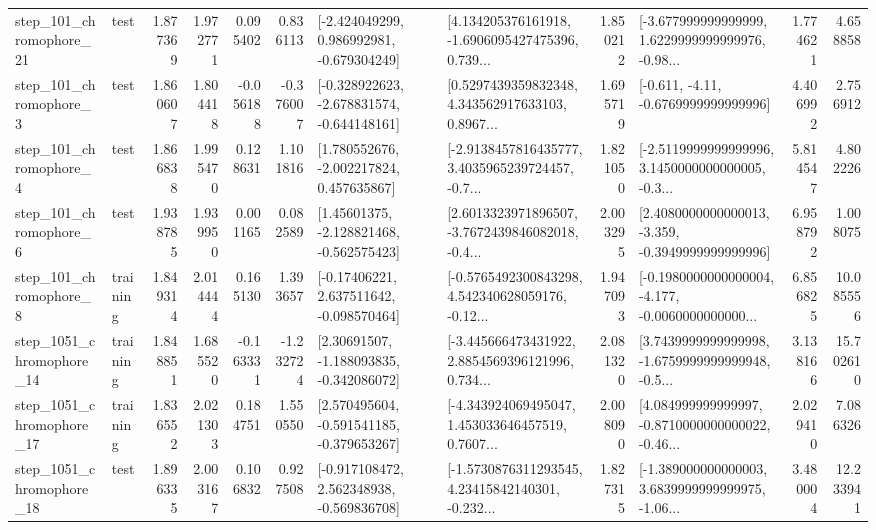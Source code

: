 \begin{tabular}{llrrrrllrlrr}
  step\_101\_chromophore\_21 &      test &      1.877369 &    1.972771 &      0.095402 &  0.836113 &   [-2.424049299, 0.986992981, -0.679304249] &  [4.134205376161918, -1.6906095427475396, 0.739... &       1.850212 &  [-3.677999999999999, 1.6229999999999976, -0.98... &            1.774621 &          4.658858 \\
   step\_101\_chromophore\_3 &      test &      1.860607 &    1.804418 &     -0.056188 & -0.376007 &  [-0.328922623, -2.678831574, -0.644148161] &  [0.5297439359832348, 4.343562917633103, 0.8967... &       1.695719 &               [-0.611, -4.11, -0.6769999999999996] &            4.406992 &          2.756912 \\
   step\_101\_chromophore\_4 &      test &      1.866838 &    1.995470 &      0.128631 &  1.101816 &    [1.780552676, -2.002217824, 0.457635867] &  [-2.9138457816435777, 3.4035965239724457, -0.7... &       1.821050 &  [-2.5119999999999996, 3.1450000000000005, -0.3... &            5.814547 &          4.802226 \\
   step\_101\_chromophore\_6 &      test &      1.938785 &    1.939950 &      0.001165 &  0.082589 &    [1.45601375, -2.128821468, -0.562575423] &  [2.6013323971896507, -3.7672439846082018, -0.4... &       2.003295 &  [2.4080000000000013, -3.359, -0.3949999999999996] &            6.958792 &          1.008075 \\
   step\_101\_chromophore\_8 &  training &      1.849314 &    2.014444 &      0.165130 &  1.393657 &    [-0.17406221, 2.637511642, -0.098570464] &  [-0.5765492300843298, 4.542340628059176, -0.12... &       1.947093 &  [-0.1980000000000004, -4.177, -0.0060000000000... &            6.856825 &         10.085556 \\
 step\_1051\_chromophore\_14 &  training &      1.848851 &    1.685520 &     -0.163331 & -1.232724 &    [2.30691507, -1.188093835, -0.342086072] &  [-3.445666473431922, 2.8854569396121996, 0.734... &       2.081320 &  [3.7439999999999998, -1.6759999999999948, -0.5... &            3.138166 &         15.702610 \\
 step\_1051\_chromophore\_17 &  training &      1.836552 &    2.021303 &      0.184751 &  1.550550 &   [2.570495604, -0.591541185, -0.379653267] &  [-4.343924069495047, 1.453033646457519, 0.7607... &       2.008090 &  [4.084999999999997, -0.8710000000000022, -0.46... &            2.029410 &          7.086326 \\
 step\_1051\_chromophore\_18 &      test &      1.896335 &    2.003167 &      0.106832 &  0.927508 &   [-0.917108472, 2.562348938, -0.569836708] &  [-1.5730876311293545, 4.23415842140301, -0.232... &       1.827315 &  [-1.389000000000003, 3.6839999999999975, -1.06... &            3.480004 &         12.233941 \\

\end{tabular}
